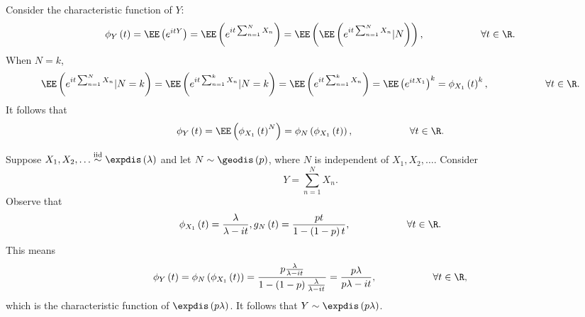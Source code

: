 \documentclass[stat901]{subfiles}
\begin{document}
    \np Consider the characteristic function of $Y$:
    \begin{equation*}
        \phi_Y\left( t \right) = \EE\left( e^{itY} \right) = \EE\left( e^{it\sum^{N}_{n=1}X_n} \right) = \EE\left( \EE\left( e^{it\sum^{N}_{n=1}X_n}|N \right) \right), \hspace{2cm}\forall t\in\R.
    \end{equation*}
    When $N=k$,
    \begin{equation*}
        \EE\left( e^{it\sum^{N}_{n=1}X_n}|N=k \right) = \EE\left( e^{it\sum^{k}_{n=1}X_n}|N=k \right) = \EE\left( e^{it\sum^{k}_{n=1}X_n} \right) = \EE\left( e^{itX_1} \right)^k = \phi_{X_1}\left( t \right)^k, \hspace{2cm}\forall t\in\R.
    \end{equation*}
    It follows that
    \begin{equation*}
        \phi_Y\left( t \right) = \EE\left( \phi_{X_1}\left( t \right)^N \right) = \phi_N\left( \phi_{X_1}\left( t \right) \right), \hspace{2cm}\forall t\in\R.
    \end{equation*}
    
    \begin{example}{}
        Suppose $X_1,X_2,\ldots\overset{\text{iid}}{\sim}\expdis\left( \lambda \right)$ and let $N\sim\geodis\left( p \right)$, where $N$ is independent of $X_1,X_2,\ldots$. Consider
        \begin{equation*}
            Y = \sum^{N}_{n=1}X_n.
        \end{equation*}
        Observe that
        \begin{equation*}
            \phi_{X_1}\left( t \right) = \frac{\lambda}{\lambda-it}, g_N\left( t \right) = \frac{pt}{1-\left( 1-p \right)t}, \hspace{2cm}\forall t\in\R.
        \end{equation*}
        This means
        \begin{equation*}
            \phi_Y\left( t \right) = \phi_N\left( \phi_{X_1}\left( t \right) \right) = \frac{p \frac{\lambda}{\lambda-it}}{1-\left( 1-p \right) \frac{\lambda}{\lambda-it}} = \frac{p\lambda}{p\lambda-it}, \hspace{2cm}\forall t\in\R,
        \end{equation*}
        which is the characteristic function of $\expdis\left( p\lambda \right)$. It follows that $Y\sim\expdis\left( p\lambda \right)$.
    \end{example}

    \rruleline
    
    
    
    
    
    
    
    
    
    
    
    
    
    
    
    
    
    
    
    
    
    
    
    
    
    
    
    
    
    
    
    
    
    
    
    
    
    
    
\end{document}
